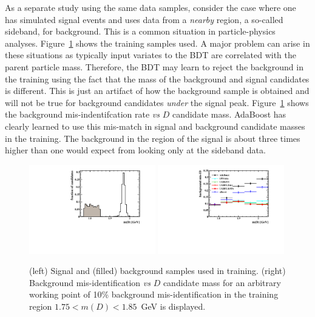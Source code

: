 As a separate study using the same data samples, consider the case where one has simulated signal events and uses data from a {\em nearby} region, a so-called sideband, for background.  This is a common situation in particle-physics analyses.  Figure~\ref{fig:md_results} shows the training samples used.  A major problem can arise in these situations as typically input variates to the BDT are correlated with the parent particle mass.  Therefore, the BDT may learn to reject the background in the training using the fact that the mass of the background and signal candidates is different.  This is just an artifact of how the background sample is obtained and will not be true for background candidates {\em under} the signal peak.  Figure~\ref{fig:md_results} shows the background mis-indentifcation rate {\em vs} $D$ candidate mass.  AdaBoost has clearly learned to use this mis-match in signal and background candidate masses in the training.   The background in the region of the signal is about three times higher than one would expect from looking only at the sideband data.  


\begin{figure}[] 
  \centering 
  \includegraphics[width=0.49\textwidth]{mD_train.pdf}
  \includegraphics[width=0.49\textwidth]{MD_eff.pdf}
  \caption{\label{fig:md_results} (left) Signal and (filled) background samples used in training.  (right) Background mis-identification {\em vs} $D$ candidate mass for an arbitrary working point of 10\% background mis-identification in the training region $1.75 < m(D) < 1.85$~GeV is displayed.}
\end{figure}

